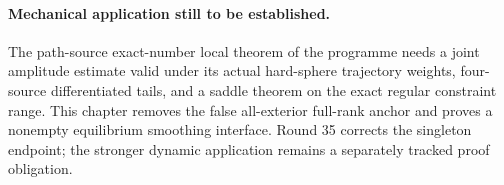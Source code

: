 \paragraph{Mechanical application still to be established.}
The path-source exact-number local theorem of the programme needs a joint amplitude estimate valid under its actual hard-sphere trajectory weights, four-source differentiated tails, and a saddle theorem on the exact regular constraint range. This chapter removes the false all-exterior full-rank anchor and proves a nonempty equilibrium smoothing interface. Round 35 corrects the singleton endpoint; the stronger dynamic application remains a separately tracked proof obligation.
